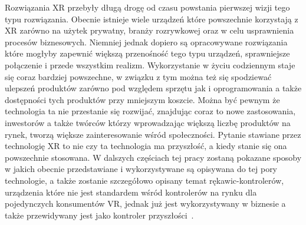 Rozwiązania XR przebyły długą drogę od czasu powstania pierwszej wizji tego typu rozwiązania. Obecnie istnieje wiele urządzeń które powszechnie korzystają z XR zarówno na użytek prywatny, branży rozrywkowej oraz w celu usprawnienia procesów biznesowych. Niemniej jednak dopiero są opracowywane rozwiązania które mogłyby zapewnić większą przenośność tego typu urządzeń, sprawniejsze połączenie i przede wszystkim realizm. Wykorzystanie w życiu codziennym staje się coraz bardziej powszechne, w związku z tym można też się  spodziewać ulepszeń produktów zarówno pod względem sprzętu jak i oprogramowania a także dostępności tych produktów przy mniejszym koszcie. Można być pewnym że technologia ta nie przestanie się rozwijać, znajdując coraz to nowe zastosowania, inwestorów a także twórców którzy wprowadzając większą liczbę produktów na rynek, tworzą większe zainteresowanie wśród społeczności. Pytanie stawiane przez technologię XR to nie czy ta technologia ma przyszłość, a kiedy stanie się ona powszechnie stosowana. W dalszych częściach tej pracy zostaną pokazane sposoby w jakich obecnie przedstawiane i wykorzystywane są opisywana do tej pory technologie, a także zostanie szczegółowo opisany temat rękawic-kontrolerów, urządzenia które nie jest standardem wśród kontrolerów na rynku dla pojedynczych konsumentów VR, jednak już jest wykorzystywany w biznesie a także przewidywany jest jako kontroler przyszłości~\cite{terms}.

